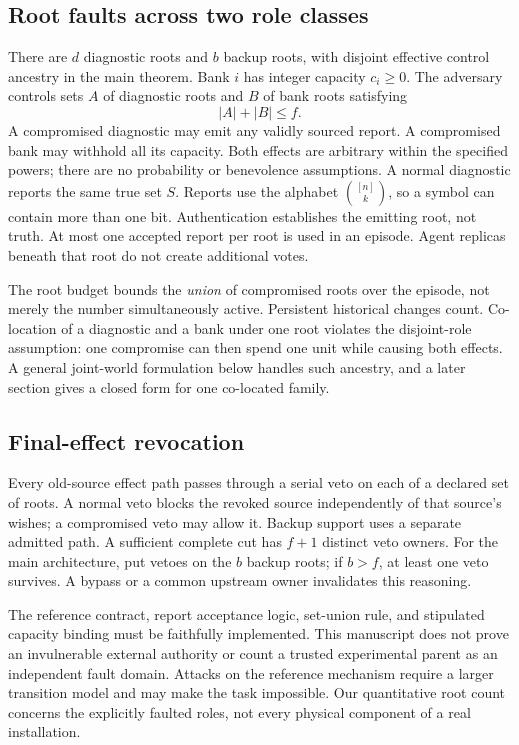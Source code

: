 \documentclass[11pt,a4paper]{article}
\theoremstyle{definition}\newtheorem{definition}{Definition}
\begin{document}
\subsection{Root faults across two role classes}
There are $d$ diagnostic roots and $b$ backup roots, with disjoint effective control ancestry in the main theorem. Bank $i$ has integer capacity $c_i\geq0$. The adversary controls sets $A$ of diagnostic roots and $B$ of bank roots satisfying
\begin{equation}
\label{eq:budget}
|A|+|B|\leq f.
\end{equation}
A compromised diagnostic may emit any validly sourced report. A compromised bank may withhold all its capacity. Both effects are arbitrary within the specified powers; there are no probability or benevolence assumptions. A normal diagnostic reports the same true set $S$. Reports use the alphabet $\binom{[n]}{k}$, so a symbol can contain more than one bit. Authentication establishes the emitting root, not truth. At most one accepted report per root is used in an episode. Agent replicas beneath that root do not create additional votes.

The root budget bounds the \emph{union} of compromised roots over the episode, not merely the number simultaneously active. Persistent historical changes count. Co-location of a diagnostic and a bank under one root violates the disjoint-role assumption: one compromise can then spend one unit while causing both effects. A general joint-world formulation below handles such ancestry, and a later section gives a closed form for one co-located family.

\subsection{Final-effect revocation}
Every old-source effect path passes through a serial veto on each of a declared set of roots. A normal veto blocks the revoked source independently of that source's wishes; a compromised veto may allow it. Backup support uses a separate admitted path. A sufficient complete cut has $f+1$ distinct veto owners. For the main architecture, put vetoes on the $b$ backup roots; if $b>f$, at least one veto survives. A bypass or a common upstream owner invalidates this reasoning.

The reference contract, report acceptance logic, set-union rule, and stipulated capacity binding must be faithfully implemented. This manuscript does not prove an invulnerable external authority or count a trusted experimental parent as an independent fault domain. Attacks on the reference mechanism require a larger transition model and may make the task impossible. Our quantitative root count concerns the explicitly faulted roles, not every physical component of a real installation.
\end{document}
